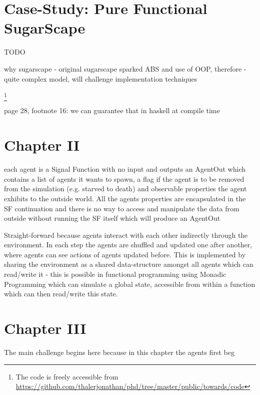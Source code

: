 \section{Case-Study: Pure Functional SugarScape}
TODO

why sugarscape
- original sugarscape sparked ABS and use of OOP, therefore 
- quite complex model, will challenge implementation techniques

\footnote{The code is freely accessible from \url{https://github.com/thalerjonathan/phd/tree/master/public/towards/code}}

\cite{weaver_replicating_nodate}

page 28, footnote 16: we can guarantee that in haskell at compile time

\section{Chapter II}
each agent is a Signal Function with no input and outputs an AgentOut which contains a list of agents it wants to spawn, a flag if the agent is to be removed from the simulation (e.g. starved to death) and observable properties the agent exhibits to the outside world. All the agents properties are encapsulated in the SF continuation and there is no way to access and manipulate the data from outside without running the SF itself which will produce an AgentOut

Straight-forward because agents interact with each other indirectly through the environment. In each step the agents are shuffled and updated one after another, where agents can see actions of agents updated before. This is implemented by sharing the environment as a shared data-structure amongst all agents which can read/write it - this is possible in functional programming using Monadic Programming which can simulate a global state, accessible from within a function which can then read/write this state. 

\section{Chapter III}
The main challenge begins here because in this chapter the agents first beg
